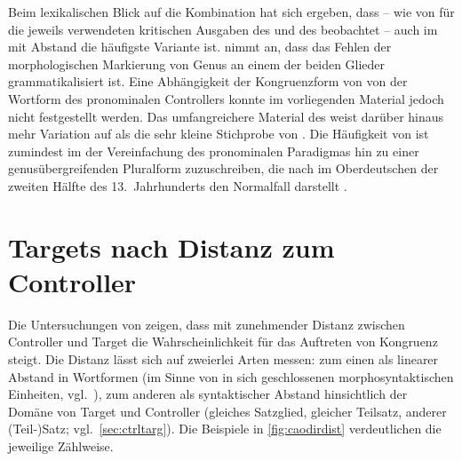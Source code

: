 Beim lexikalischen Blick auf die Kombination  hat sich ergeben,
dass -- wie von \citet{askedal1973} für die jeweils verwendeten kritischen
Ausgaben des  und des  beobachtet -- auch im
\CAO{} mit Abstand die häufigste Variante  ist.
\citeauthor{askedal1973} nimmt an, dass das Fehlen der morphologischen
Markierung von Genus an einem der beiden Glieder grammatikalisiert ist. Eine
Abhängigkeit der Kongruenzform von  von der Wortform des pronominalen
Controllers konnte im vorliegenden Material jedoch nicht festgestellt werden.
Das umfangreichere Material des \CAO{} weist darüber hinaus mehr
Variation auf als die sehr kleine Stichprobe von \citeauthor{askedal1973}. Die
Häufigkeit von   ist zumindest im \CAO{} der
Vereinfachung des pronominalen Paradigmas hin zu einer genusübergreifenden
Pluralform zuzuschreiben, die nach \citet[391--392]{ksw2} im Oberdeutschen der
zweiten Hälfte des 13.~Jahrhunderts den Normalfall darstellt \autocite[vgl.\
auch][37--39]{sparmann1961}.


\section{Targets nach Distanz zum Controller}
\label{sec:caotargdist}

Die Untersuchungen von \citet{corbett1979} zeigen, dass mit zunehmender Distanz
zwischen Controller und Target die Wahrscheinlichkeit für das Auftreten von
Kongruenz \fw{ad sensum} steigt. Die Distanz lässt sich auf zweierlei Arten
messen: zum einen als linearer Abstand in Wortformen (im Sinne von in sich
geschlossenen morphosyntaktischen Einheiten, vgl.~\cite[252--253]{bauer2000}),
zum anderen als syntaktischer Abstand hinsichtlich der Domäne von Target und
Controller (gleiches Satzglied, gleicher Teilsatz, anderer (Teil-)Satz;
vgl.~\cref{sec:ctrltarg}). Die Beispiele in \cref{fig:caodirdist} verdeutlichen
die jeweilige Zählweise.

